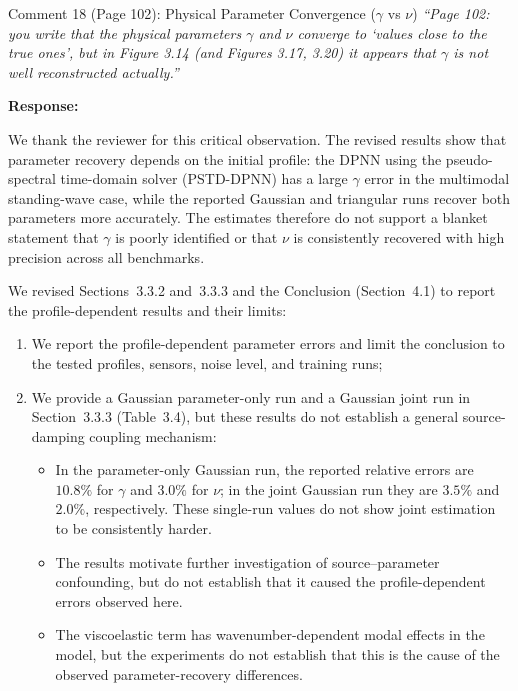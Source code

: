 \documentclass[11pt,a4paper]{article}
\newenvironment{response}{
    \par\vspace{1mm}\noindent\textbf{\textcolor{responseframe}{Response:}}\par\vspace{1mm}
}{
    \par\vspace{3mm}
}
\begin{document}
\vspace{2mm}
\begin{revcomment}{Comment 18 (Page 102): Physical Parameter Convergence ($\gamma$ vs $\nu$)}
\emph{``Page 102: you write that the physical parameters $\gamma$ and $\nu$ converge to `values close to the true ones', but in Figure 3.14 (and Figures 3.17, 3.20) it appears that $\gamma$ is not well reconstructed actually.''}
\end{revcomment}

\begin{response}
We thank the reviewer for this critical observation. The revised results show that parameter recovery depends on the initial profile: the DPNN using the pseudo-spectral time-domain solver (PSTD-DPNN) has a large $\gamma$ error in the multimodal standing-wave case, while the reported Gaussian and triangular runs recover both parameters more accurately. The estimates therefore do not support a blanket statement that $\gamma$ is poorly identified or that $\nu$ is consistently recovered with high precision across all benchmarks.

We revised Sections~3.3.2 and~3.3.3 and the Conclusion (Section~4.1) to report the profile-dependent results and their limits:
\begin{enumerate}[leftmargin=*]
    \item We report the profile-dependent parameter errors and limit the conclusion to the tested profiles, sensors, noise level, and training runs;
    \item We provide a Gaussian parameter-only run and a Gaussian joint run in Section~3.3.3 (Table~3.4), but these results do not establish a general source-damping coupling mechanism:
    \begin{itemize}
        \item In the parameter-only Gaussian run, the reported relative errors are $10.8\%$ for $\gamma$ and $3.0\%$ for $\nu$; in the joint Gaussian run they are $3.5\%$ and $2.0\%$, respectively. These single-run values do not show joint estimation to be consistently harder.
        \item The results motivate further investigation of source--parameter confounding, but do not establish that it caused the profile-dependent errors observed here.
        \item The viscoelastic term has wavenumber-dependent modal effects in the model, but the experiments do not establish that this is the cause of the observed parameter-recovery differences.
    \end{itemize}
\end{enumerate}
\end{response}
\end{document}
